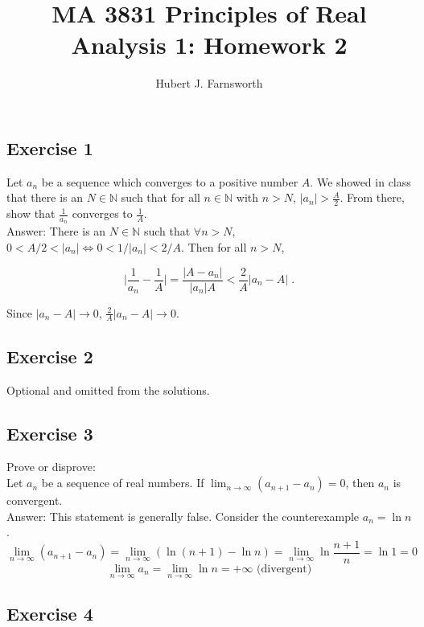 \documentclass{article}
\title{MA 3831 Principles of Real Analysis 1: Homework 2}
\author{Hubert J. Farnsworth}
\begin{document}
\maketitle


\subsection*{Exercise 1}

Let $a_n$ be a sequence which converges to a positive number $A$. We showed in class that there
is an $N \in \mathbb{N}$ such that for all $n \in \mathbb{N}$ with $n > N$, $|a_n| > \frac{A}{2}$. From there, show that $\frac{1}{a_n}$ converges to $\frac{1}{A}$.  \\

Answer: There is an $N \in \mathbb{N}$ such that $\forall n > N$, $0< A/2 < |a_n| \iff 0< 1/|a_n| < 2/A$. Then for all $n > N$,

$$
\biggr\vert \frac{1}{a_n} - \frac{1}{A} \biggr\rvert
= \frac{|A-a_n|}{|a_n|A} < \frac{2}{A}|a_n - A| \;.
$$

Since $|a_n - A| \rightarrow 0$, $\frac{2}{A}|a_n - A| \rightarrow 0$. 

\subsection*{Exercise 2}

Optional and omitted from the solutions. 

\subsection*{Exercise 3}

Prove or disprove: \\
Let $a_n$ be a sequence of real numbers. If $\lim_{n \rightarrow \infty} (a_{n+1} - a_n) = 0$, then $a_n$ is convergent. \\

Answer: This statement is generally false. Consider the counterexample $a_n = \ln n$.
$$
\lim_{n\rightarrow \infty} (a_{n+1} - a_n) = \lim_{n\rightarrow \infty} (\ln (n+1) - \ln n)
= \lim_{n\rightarrow \infty}\ln \frac{n+1}{n} = \ln 1 = 0$$
$$
\lim_{n\rightarrow \infty} a_n = \lim_{n\rightarrow \infty} \ln n = +\infty \text{ (divergent)}
$$

\subsection*{Exercise 4}
\end{document}
